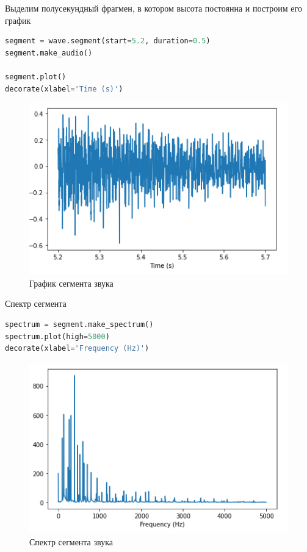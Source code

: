 Выделим полусекундный фрагмен, в котором высота постоянна и построим его график
\begin{lstlisting}[language=Python]
segment = wave.segment(start=5.2, duration=0.5)
segment.make_audio()

segment.plot()
decorate(xlabel='Time (s)')
\end{lstlisting}

\begin{figure}[H]
	\begin{center}
		\includegraphics[scale=1]{fig/lab01/lab01_02.png}
		\caption{График сегмента звука}
	\end{center}
\end{figure}

Спектр сегмента
\begin{lstlisting}[language=Python]
spectrum = segment.make_spectrum()
spectrum.plot(high=5000)
decorate(xlabel='Frequency (Hz)')
\end{lstlisting}

\begin{figure}[H]
	\begin{center}
		\includegraphics[scale=1]{fig/lab01/lab01_03.png}
		\caption{Спектр сегмента звука}
	\end{center}
\end{figure}

